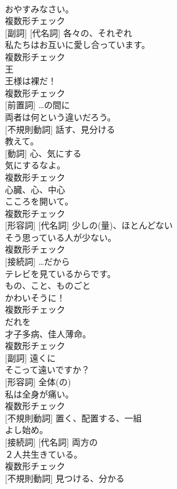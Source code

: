 \documentclass[8pt]{extreport}
\begin{document}
\begin{CJK}{UTF8}{min}
\\	おやすみなさい。	
\\	複数形チェック
\\	[形容詞] [副詞] [代名詞]	各々の、それぞれ	
\\	私たちはお互いに愛し合っています。	
\\	複数形チェック
\\	[名詞]	王	
\\	王様は裸だ！	
\\	複数形チェック
\\	[副詞] [前置詞]	…の間に	
\\	両者は何という違いだろう。	
\\	[動詞] [不規則動詞]	話す、見分ける	
\\	教えて。	
\\	[名詞] [動詞]	心、気にする	
\\	気にするなよ。	
\\	複数形チェック
\\	[名詞]	心臓、心、中心	
\\	こころを開いて。	
\\	複数形チェック
\\	[名詞] [形容詞] [代名詞]	少しの(量)、ほとんどない	
\\	そう思っている人が少ない。	
\\	複数形チェック
\\	[前置詞] [接続詞]	…だから	
\\	テレビを見ているからです。	
\\	[名詞]	もの、こと、ものごと	
\\	かわいそうに！	
\\	複数形チェック
\\	[代名詞]	だれを	
\\	才子多病、佳人薄命。	
\\	複数形チェック
\\	[形容詞] [副詞]	遠くに	
\\	そこって遠いですか？	
\\	[名詞] [形容詞]	全体(の)	
\\	私は全身が痛い。	
\\	複数形チェック
\\	[動詞] [不規則動詞]	置く、配置する、一組	
\\	よし始め。	
\\	[形容詞] [接続詞] [代名詞]	両方の	
\\	２人共生きている。	
\\	複数形チェック
\\	[動詞] [不規則動詞]	見つける、分かる	

\end{CJK}
\end{document}
